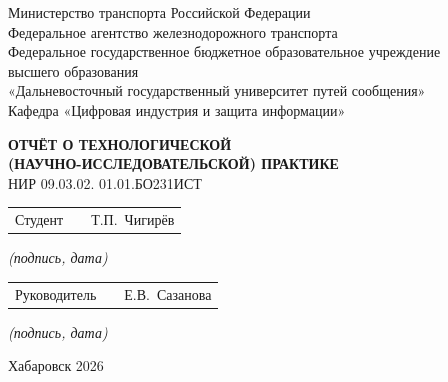 \documentclass[14pt]{extarticle}
\begin{document}
\begin{titlepage}
\thispagestyle{empty}
\begin{center}
Министерство транспорта Российской Федерации\\
Федеральное агентство железнодорожного транспорта\\[0.2em]

Федеральное государственное бюджетное образовательное учреждение\\
высшего образования\\
«Дальневосточный государственный университет путей сообщения»\\[0.2em]

Кафедра «Цифровая индустрия и защита информации»
\vfill

{\bfseries
\large ОТЧЁТ О ТЕХНОЛОГИЧЕСКОЙ\\[0.3em]
\large (НАУЧНО-ИССЛЕДОВАТЕЛЬСКОЙ) ПРАКТИКЕ
}\\[0.3em]
\Large НИР 09.03.02. 01.01.БО231ИСТ
\large
\vfill

\begin{center}
\begin{minipage}{\textwidth}
  \setlength{\tabcolsep}{0pt}
  \begin{tabular}{@{}p{4cm}p{9cm}p{4cm}@{}}
    Студент
      & \centering\hrulefill
      & \centering Т.П.~Чигирёв \\[0em]
  \end{tabular}
\end{minipage}
\end{center}

\vspace{-25pt}
\small\textit{(подпись, дата)}
\large

\begin{center}
\begin{minipage}{\textwidth}
  \setlength{\tabcolsep}{0pt}
  \begin{tabular}{@{}p{4cm}p{9cm}p{4cm}@{}}
    Руководитель
      & \centering\hrulefill
      & \centering Е.В.~Сазанова \\[0em]
  \end{tabular}
\end{minipage}
\end{center}

\vspace{-20pt}
\small\textit{(подпись, дата)}
\normalsize

\vfill
\normalsize Хабаровск 2026

\end{center}
\end{titlepage}
\end{document}

